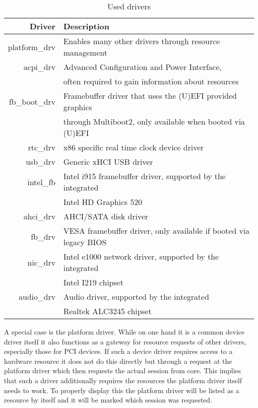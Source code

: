 \documentclass[
a4paper,
12pt,
notitlepage,
parskip=half,
DIV=11,
]{scrbook}
\begin{document}
		\begin{table}[]
			\centering
			\begin{tabular}{r|l}
				Driver        & 
				Description 
				\\ \hline
				platform\_drv & 
				Enables many other drivers through resource management
				\\ \hline
				acpi\_drv     &
				Advanced Configuration and Power Interface,
				\\& often required to gain information about resources \citep{acpi_spec}
				\\ \hline
				fb\_boot\_drv &
				Framebuffer driver that uses the (U)EFI provided graphics
				\\& through Multiboot2, only available when booted via (U)EFI  \citep{multiboot2}
				\\ \hline
				rtc\_drv      &
				x86 specific real time clock device driver
				\\ \hline
				usb\_drv      &
				Generic xHCI USB driver \citep{xhci}
				\\ \hline
				intel\_fb     &
				Intel i915 framebuffer driver, supported by the integrated
				\\& Intel HD Graphics 520 \citep{x260}
				\\ \hline
				ahci\_drv     &
				AHCI/SATA disk driver
				\\ \hline
				fb\_drv       &
				VESA framebuffer driver, only available if booted via legacy BIOS
				\\ \hline
				nic\_drv      &
				Intel e1000 network driver, supported by the integrated
				\\& Intel I219 chipset \citep{x260}
				\\  \hline
				audio\_drv    &
				Audio driver, supported by the integrated
				\\& Realtek ALC3245 chipset \citep{x260}
			\end{tabular}
			\caption{Used drivers}
			\label{driver_selection}
		\end{table}
		
		A special case is the platform driver.
		While on one hand it is a common device driver itself it also functions as a gateway for resource requests of other drivers, especially those for PCI devices.
		If such a device driver requires access to a hardware resource it does not do this directly but through a request at the platform driver which then requests the actual session from core.
		This implies that such a driver additionally requires the resources the platform driver itself needs to work.
		To properly display this the platform driver will be listed as a resource by itself and it will be marked which session was requested.
		
\end{document}
